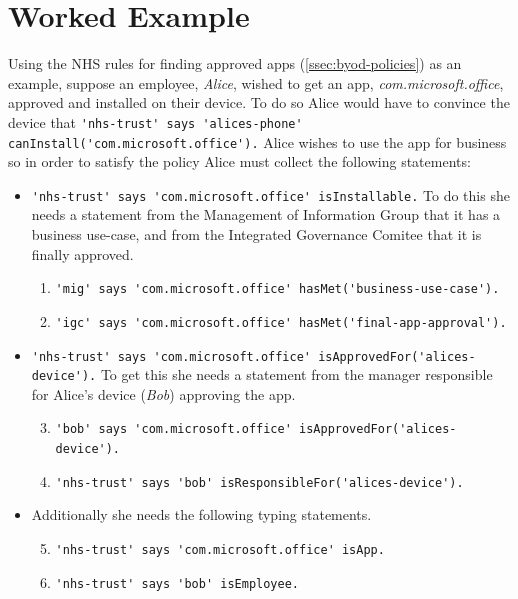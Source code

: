 \documentclass{llncs}
\begin{document}
\section{Worked Example}

Using the NHS rules for finding approved apps (\autoref{ssec:byod-policies}) as an example, suppose an employee, \emph{Alice}, wished to get an app, \emph{\ttfamily com.microsoft.office}, approved and installed on their device.
To do so Alice would have to convince the device that \lstinline{'nhs-trust' says 'alices-phone' canInstall('com.microsoft.office').}
Alice wishes to use the app for business so in order to satisfy the policy Alice must collect the following statements:
\begin{itemize}
    \newcommand{\weitemsize}[0]{\footnotesize}
  \item {\weitemsize \lstinline{'nhs-trust' says 'com.microsoft.office' isInstallable.}\newline}
    To do this she needs a statement from the Management of Information Group that it has a business use-case, and from the Integrated Governance Comitee that it is finally approved.
    \begin{enumerate}\setcounter{enumi}{0}
      \item {\weitemsize \lstinline{'mig' says 'com.microsoft.office' hasMet('business-use-case').}}
      \item {\weitemsize \lstinline{'igc' says 'com.microsoft.office' hasMet('final-app-approval').}}
    \end{enumerate}
  \item {\weitemsize \lstinline{'nhs-trust' says 'com.microsoft.office' isApprovedFor('alices-device').}}
    To get this she needs a statement from the manager responsible for Alice's device (\emph{Bob}) approving the app.
    \begin{enumerate}\setcounter{enumi}{2}
      \item {\weitemsize \lstinline{'bob' says 'com.microsoft.office' isApprovedFor('alices-device').}}
      \item {\weitemsize \lstinline{'nhs-trust' says 'bob' isResponsibleFor('alices-device').}}
    \end{enumerate}
  \item Additionally she needs the following typing statements.
    \begin{enumerate}\setcounter{enumi}{4}
      \item {\weitemsize \lstinline{'nhs-trust' says 'com.microsoft.office' isApp.}} \label{item:isapp}
      \item {\weitemsize \lstinline{'nhs-trust' says 'bob' isEmployee.}}
    \end{enumerate}
\end{itemize}
\end{document}
